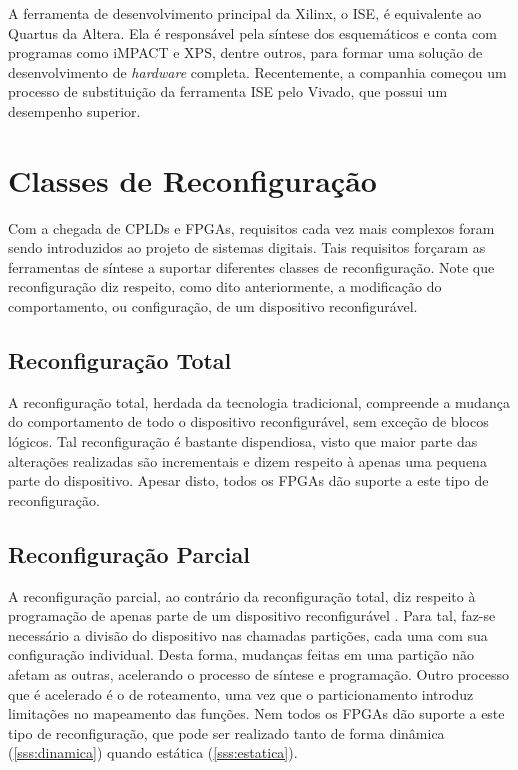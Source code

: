 \documentclass[11pt,a4paper,oneside]{book}
\begin{document}
A ferramenta de desenvolvimento principal da Xilinx, o ISE, é equivalente ao Quartus da Altera.
Ela é responsável pela síntese dos esquemáticos e conta com programas como iMPACT e XPS, dentre outros, para formar uma solução de desenvolvimento de \textit{hardware} completa.
Recentemente, a companhia começou um processo de substituição da ferramenta ISE pelo Vivado, que possui um desempenho superior.

\section{Classes de Reconfigura\c{c}\~ao}
Com a chegada de CPLDs e FPGAs, requisitos cada vez mais complexos foram sendo introduzidos ao projeto de sistemas digitais.
Tais requisitos for\c{c}aram as ferramentas de s\'i­ntese a suportar diferentes classes de reconfigura\c{c}\~ao.
Note que reconfigura\c{c}\~ao diz respeito, como dito anteriormente, a modifica\c{c}\~ao do comportamento, ou configura\c{c}\~ao, de um dispositivo reconfigur\'avel.

\subsection{Reconfigura\c{c}\~ao Total}
A reconfigura\c{c}\~ao total, herdada da tecnologia tradicional, compreende a mudan\c{c}a do comportamento de todo o dispositivo reconfigur\'avel, sem exce\c{c}\~ao de blocos l\'ogicos.
Tal reconfigura\c{c}\~ao \'e bastante dispendiosa, visto que maior parte das alterações realizadas são incrementais e dizem respeito \`a apenas uma pequena parte do dispositivo.
Apesar disto, todos os FPGAs d\~ao suporte a este tipo de reconfigura\c{c}\~ao.

\subsection{Reconfigura\c{c}\~ao Parcial}
A reconfigura\c{c}\~ao parcial, ao contr\'ario da reconfigura\c{c}\~ao total, diz respeito \`a programa\c{c}\~ao de apenas parte de um dispositivo reconfigur\'avel \cite{Hauck2007}.
Para tal, faz-se necess\'ario a divis\~ao do dispositivo nas chamadas parti\c{c}\~oes, cada uma com sua configura\c{c}\~ao individual.
Desta forma, mudan\c{c}as feitas em uma parti\c{c}\~ao n\~ao afetam as outras, acelerando o processo de s\'i­ntese e programa\c{c}\~ao.
Outro processo que \'e acelerado \'e o de roteamento, uma vez que o particionamento introduz limita\c{c}\~oes no mapeamento das fun\c{c}\~oes.
Nem todos os FPGAs d\~ao suporte a este tipo de reconfigura\c{c}\~ao, que pode ser realizado tanto de forma dinâmica (\ref{sss:dinamica}) quando estática (\ref{sss:estatica}).
\end{document}
